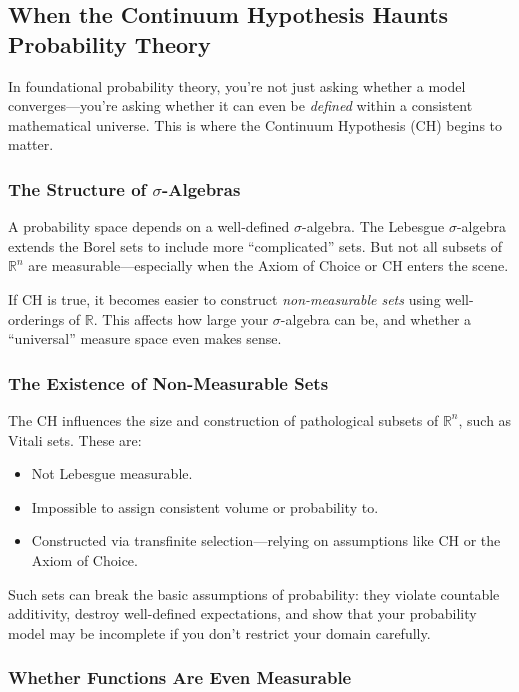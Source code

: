 \subsection{When the Continuum Hypothesis Haunts Probability Theory}

In foundational probability theory, you're not just asking whether a model converges—you’re asking whether it can even be \emph{defined} within a consistent mathematical universe. This is where the Continuum Hypothesis (CH) begins to matter.

\subsubsection{The Structure of \(\sigma\)-Algebras}

A probability space depends on a well-defined \(\sigma\)-algebra. The Lebesgue \(\sigma\)-algebra extends the Borel sets to include more “complicated” sets. But not all subsets of \(\mathbb{R}^n\) are measurable—especially when the Axiom of Choice or CH enters the scene.

If CH is true, it becomes easier to construct \emph{non-measurable sets} using well-orderings of \(\mathbb{R}\). This affects how large your \(\sigma\)-algebra can be, and whether a “universal” measure space even makes sense.

\subsubsection{The Existence of Non-Measurable Sets}

The CH influences the size and construction of pathological subsets of \(\mathbb{R}^n\), such as Vitali sets. These are:
\begin{itemize}
  \item Not Lebesgue measurable.
  \item Impossible to assign consistent volume or probability to.
  \item Constructed via transfinite selection—relying on assumptions like CH or the Axiom of Choice.
\end{itemize}

Such sets can break the basic assumptions of probability: they violate countable additivity, destroy well-defined expectations, and show that your probability model may be incomplete if you don’t restrict your domain carefully.

\subsubsection{Whether Functions Are Even Measurable}

